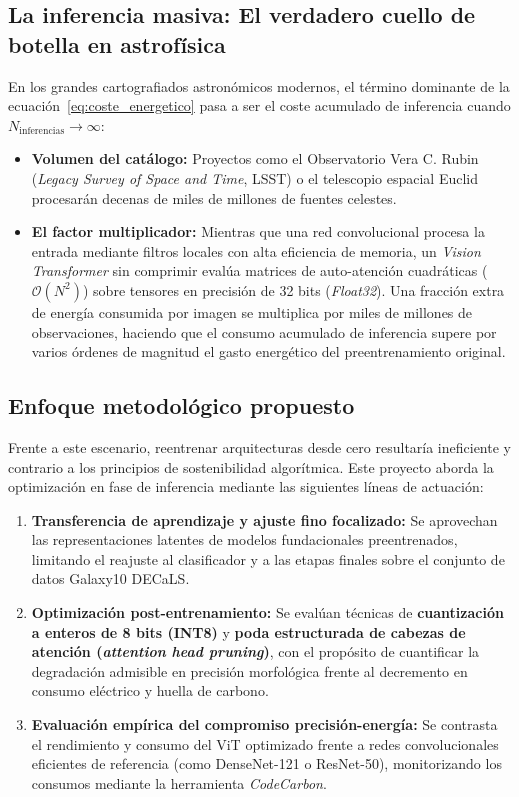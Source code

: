 \subsection{La inferencia masiva: El verdadero cuello de botella en astrofísica}
En los grandes cartografiados astronómicos modernos, el término dominante de la ecuación~\eqref{eq:coste_energetico} pasa a ser el coste acumulado de inferencia cuando $N_{\text{inferencias}} \to \infty$:
\begin{itemize}
    \item \textbf{Volumen del catálogo:} Proyectos como el Observatorio Vera C. Rubin (\textit{Legacy Survey of Space and Time}, LSST) o el telescopio espacial Euclid procesarán decenas de miles de millones de fuentes celestes.
    \item \textbf{El factor multiplicador:} Mientras que una red convolucional procesa la entrada mediante filtros locales con alta eficiencia de memoria, un \textit{Vision Transformer} sin comprimir evalúa matrices de auto-atención cuadráticas ($\mathcal{O}(N^2)$) sobre tensores en precisión de 32 bits (\textit{Float32}). Una fracción extra de energía consumida por imagen se multiplica por miles de millones de observaciones, haciendo que el consumo acumulado de inferencia supere por varios órdenes de magnitud el gasto energético del preentrenamiento original.
\end{itemize}

\subsection{Enfoque metodológico propuesto}
Frente a este escenario, reentrenar arquitecturas desde cero resultaría ineficiente y contrario a los principios de sostenibilidad algorítmica. Este proyecto aborda la optimización en fase de inferencia mediante las siguientes líneas de actuación:
\begin{enumerate}
    \item \textbf{Transferencia de aprendizaje y ajuste fino focalizado:} Se aprovechan las representaciones latentes de modelos fundacionales preentrenados, limitando el reajuste al clasificador y a las etapas finales sobre el conjunto de datos Galaxy10 DECaLS.
    \item \textbf{Optimización post-entrenamiento:} Se evalúan técnicas de \textbf{cuantización a enteros de 8 bits (INT8)} y \textbf{poda estructurada de cabezas de atención (\textit{attention head pruning})}, con el propósito de cuantificar la degradación admisible en precisión morfológica frente al decremento en consumo eléctrico y huella de carbono.
    \item \textbf{Evaluación empírica del compromiso precisión-energía:} Se contrasta el rendimiento y consumo del ViT optimizado frente a redes convolucionales eficientes de referencia (como DenseNet-121 o ResNet-50), monitorizando los consumos mediante la herramienta \textit{CodeCarbon}.
\end{enumerate}
